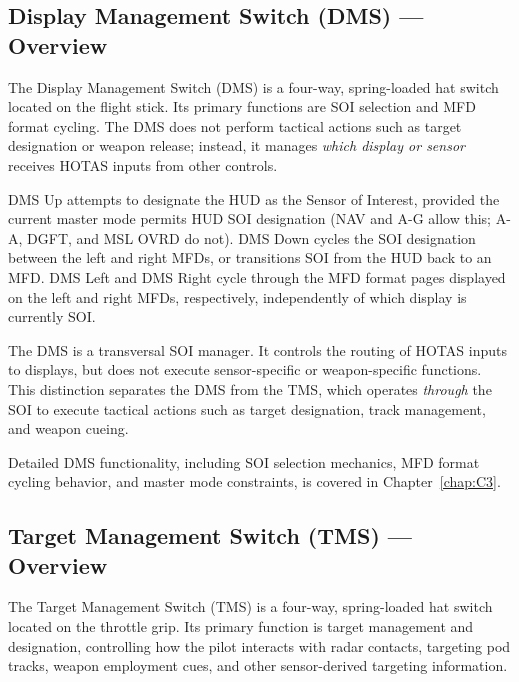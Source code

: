 \documentclass[11pt, a4paper, twoside]{report}
\begin{document}

\subsection{Display Management Switch (DMS) — Overview}
\label{sec:C2-S3-S1}

The Display Management Switch (DMS) is a four-way, spring-loaded hat switch located on the flight stick. Its primary functions are SOI selection and MFD format cycling. The DMS does not perform tactical actions such as target designation or weapon release; instead, it manages \textit{which display or sensor} receives HOTAS inputs from other controls.

DMS Up attempts to designate the HUD as the Sensor of Interest, provided the current master mode permits HUD SOI designation (NAV and A-G allow this; A-A, DGFT, and MSL OVRD do not). DMS Down cycles the SOI designation between the left and right MFDs, or transitions SOI from the HUD back to an MFD. DMS Left and DMS Right cycle through the MFD format pages displayed on the left and right MFDs, respectively, independently of which display is currently SOI.

The DMS is a transversal SOI manager. It controls the routing of HOTAS inputs to displays, but does not execute sensor-specific or weapon-specific functions. This distinction separates the DMS from the TMS, which operates \textit{through} the SOI to execute tactical actions such as target designation, track management, and weapon cueing.

Detailed DMS functionality, including SOI selection mechanics, MFD format cycling behavior, and master mode constraints, is covered in Chapter~\ref{chap:C3}.


\subsection{Target Management Switch (TMS) — Overview}
\label{sec:C2-S3-S2}

The Target Management Switch (TMS) is a four-way, spring-loaded hat switch located on the throttle grip. Its primary function is target management and designation, controlling how the pilot interacts with radar contacts, targeting pod tracks, weapon employment cues, and other sensor-derived targeting information.
\end{document}
